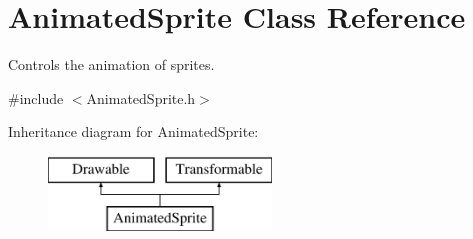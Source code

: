 \hypertarget{class_animated_sprite}{}\section{Animated\+Sprite Class Reference}
\label{class_animated_sprite}


Controls the animation of sprites.  




{\ttfamily \#include $<$Animated\+Sprite.\+h$>$}

Inheritance diagram for Animated\+Sprite\+:\begin{figure}[H]
\begin{center}
\leavevmode
\includegraphics[height=2.000000cm]{class_animated_sprite}
\end{center}
\end{figure}
